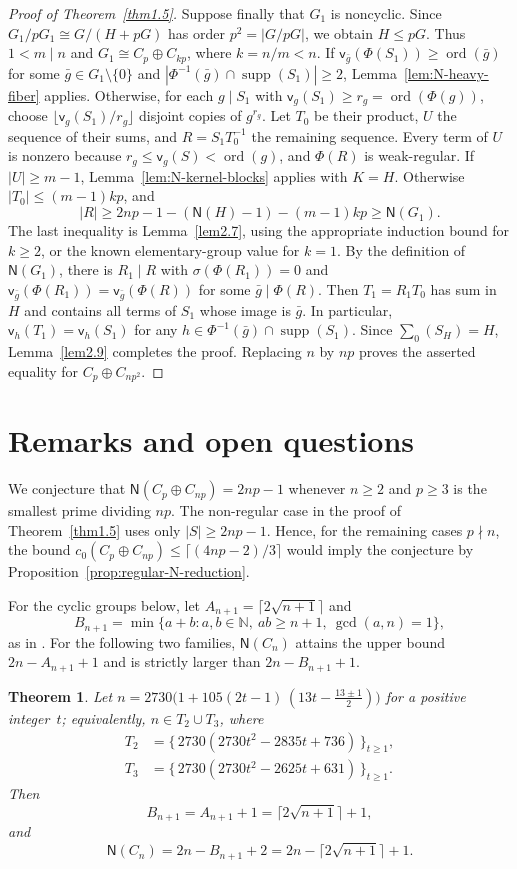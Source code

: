 \documentclass[10pt,reqno]{amsart}
\newtheorem{thm}{Theorem} [section]
\theoremstyle{definition}
\theoremstyle{remark}
\numberwithin{equation}{section}
\newcommand{\N}{\mathbb N}
\DeclareMathOperator{\ord}{ord}
\DeclareMathOperator{\supp}{supp}
\begin{document}
\begin{proof}[Proof of Theorem~\ref{thm1.5}]
Suppose finally that $G_1$ is noncyclic.
Since $G_1/pG_1\cong G/(H+pG)$ has order $p^2=|G/pG|$,
we obtain $H\le pG$.
Thus $1<m\mid n$ and $G_1\cong C_p\oplus C_{kp}$, where $k=n/m<n$.
If $\mathsf v_{\bar g}(\Phi(S_1))\ge\ord(\bar g)$ for some
$\bar g\in G_1\setminus\{0\}$ and
$|\Phi^{-1}(\bar g)\cap\supp(S_1)|\ge2$,
Lemma~\ref{lem:N-heavy-fiber} applies.
Otherwise, for each $g\mid S_1$ with
$\mathsf v_g(S_1)\ge r_g=\ord(\Phi(g))$, choose $\lfloor\mathsf v_g(S_1)/r_g\rfloor$ disjoint copies of
$g^{r_g}$.
Let $T_0$ be their product, $U$ the sequence of their sums,
and $R=S_1T_0^{-1}$ the remaining sequence.
Every term of $U$ is nonzero because $r_g\le\mathsf v_g(S)<\ord(g)$,
and $\Phi(R)$ is weak-regular.
If $|U|\ge m-1$, Lemma~\ref{lem:N-kernel-blocks} applies with $K=H$.
Otherwise $|T_0|\le(m-1)kp$, and
\[
 |R|\ge2np-1-(\mathsf N(H)-1)-(m-1)kp\ge\mathsf N(G_1).
\]
The last inequality is Lemma~\ref{lem2.7}, using the appropriate induction
bound for $k\ge2$, or the known elementary-group value for $k=1$.
By the definition of $\mathsf N(G_1)$, there is $R_1\mid R$ with
$\sigma(\Phi(R_1))=0$ and
$\mathsf v_{\bar g}(\Phi(R_1))=\mathsf v_{\bar g}(\Phi(R))$
for some $\bar g\mid\Phi(R)$.
Then $T_1=R_1T_0$ has sum in $H$ and contains all terms of $S_1$
whose image is $\bar g$. In particular,
$\mathsf v_h(T_1)=\mathsf v_h(S_1)$ for any
$h\in\Phi^{-1}(\bar g)\cap\supp(S_1)$.
Since $\sum_0(S_H)=H$, Lemma~\ref{lem2.9} completes the proof.
Replacing $n$ by $np$ proves the asserted equality for $C_p\oplus C_{np^2}$.
\end{proof}

\section{Remarks and open questions}
We conjecture that $\mathsf N(C_p\oplus C_{np})=2np-1$ whenever
$n\ge2$ and $p\ge3$ is the smallest prime dividing $np$.
The non-regular case in the proof of Theorem~\ref{thm1.5} uses only
$|S|\ge2np-1$. Hence, for the remaining cases $p\nmid n$, the bound
$c_0(C_p\oplus C_{np})\le\lceil(4np-2)/3\rceil$ would imply the
conjecture by Proposition~\ref{prop:regular-N-reduction}.

For the cyclic groups below, let $A_{n+1}=\lceil2\sqrt{n+1}\rceil$ and
\[
B_{n+1}=\min\{a+b: a,b\in\N,\ ab\ge n+1,\ \gcd(a,n)=1\},
\]
as in \cite{[JY2024]}.
For the following two families, $\mathsf N(C_n)$ attains the upper bound
$2n-A_{n+1}+1$ and is strictly larger than $2n-B_{n+1}+1$.

\begin{thm}\label{thm5.3}
	Let $n=2730\bigl(1+105(2t-1)\,(13t-\tfrac{13\pm 1}{2})\bigr)$ for a positive integer~$t$;
	equivalently, $n\in T_2\cup T_3$, where
	\begin{align*}
	T_2 &= \{\,2730(2730t^2-2835t+736)\,\}_{t\ge 1},\\
	T_3 &= \{\,2730(2730t^2-2625t+631)\,\}_{t\ge 1}.
	\end{align*}
	Then
	\[
	B_{n+1}=A_{n+1}+1=\lceil 2\sqrt{n+1}\rceil+1,
	\]
	and
	\[
	\mathsf{N}(C_n)=2n-B_{n+1}+2=2n-\lceil 2\sqrt{n+1}\rceil+1.
	\]
\end{thm}
\end{document}
